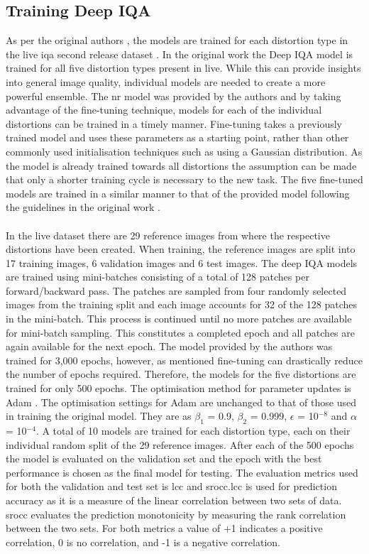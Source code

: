 \subsection{Training Deep IQA}
As per the original authors \cite{deepiqa}, the models are trained for each distortion type in the \gls{live} \gls{iqa} second release dataset \cite{livepaper} \cite{liveweb}. In the original work the Deep IQA model is trained for all five distortion types present in \gls{live}. While this can provide insights into general image quality, individual models are needed to create a more powerful ensemble. The \gls{nr} model was provided by the authors and by taking advantage of the fine-tuning technique, models for each of the individual distortions can be trained in a timely manner. Fine-tuning takes a previously trained model and uses these parameters as a starting point, rather than other commonly used initialisation techniques such as using a Gaussian distribution. As the model is already trained towards all distortions the assumption can be made that only a shorter training cycle is necessary to the new task. The five fine-tuned models are trained in a similar manner to that of the provided model following the guidelines in the original work \cite{deepiqa}. 
\\\\
In the \gls{live} dataset there are 29 reference images from where the respective distortions have been created. When training, the reference images are split into 17 training images, 6 validation images and 6 test images. The deep IQA models are trained using mini-batches consisting of a total of 128 patches per forward/backward pass. The patches are sampled from four randomly selected images from the training split and each image accounts for 32 of the 128 patches in the mini-batch. This process is continued until no more patches are available for mini-batch sampling. This constitutes a completed epoch and all patches are again available for the next epoch. The model provided by the authors was trained for 3,000 epochs, however, as mentioned fine-tuning can drastically reduce the number of epochs required. Therefore, the models for the five distortions are trained for only 500 epochs. The optimisation method for parameter updates is Adam \cite{adam} . The optimisation settings for Adam are unchanged to that of those used in training the original model. They are as $\beta_1$ = 0.9, $\beta_2$ = 0.999, $\epsilon$ = 10$^{-8}$ and $\alpha$ = 10$^{-4}$. A total of 10 models are trained for each distortion type, each on their individual random split of the 29 reference images. After each of the 500 epochs the model is evaluated on the validation set and the epoch with the best performance is chosen as the final model for testing. The evaluation metrics used for both the validation and test set is \gls{lcc} and \gls{srocc}.\gls{lcc} is used for prediction accuracy as it is a measure of the linear correlation between two sets of data. \gls{srocc} evaluates the prediction monotonicity by measuring the rank correlation between the two sets. For both metrics a value of +1 indicates a positive correlation, 0 is no correlation, and -1 is a negative correlation.
